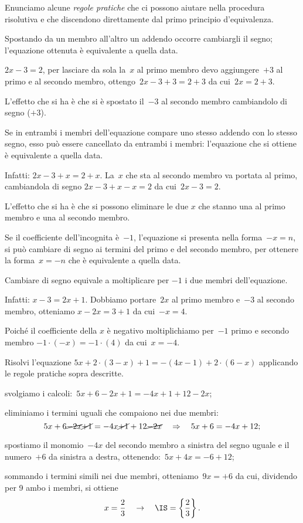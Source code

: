 Enunciamo alcune \emph{regole pratiche} che ci possono aiutare nella
procedura risolutiva e che discendono direttamente dal primo principio
d'equivalenza.
\begin{enumeratea}
\item Spostando da un membro all'altro un addendo occorre cambiargli il segno; l'equazione ottenuta è equivalente a quella data.

$2x-3=2$, per lasciare da sola la~$x$ al primo membro devo aggiungere~$+3$ al primo e
al secondo membro, ottengo~$2x-3+3=2+3$ da cui~$2x=2+3$.

L'effetto che si ha è che si è spostato il~$-3$ al
secondo membro cambiandolo di segno ($+3$).
\item Se in entrambi i membri dell'equazione compare uno
stesso addendo con lo stesso segno, esso può essere cancellato da
entrambi i membri: l'equazione che si ottiene è
equivalente a quella data.

Infatti:
$2x-3+x=2+x$. La~$x$ che sta al secondo membro va portata al primo, cambiandola di segno
$2x-3+x-x=2$ da cui~$2x-3=2$.

L'effetto che si ha è che si possono eliminare le due
$x$ che stanno una al primo membro e una al secondo membro.
\item Se il coefficiente dell'incognita è~$-1$, %
l'equazione si presenta nella forma~$-x=n$, si
può cambiare di segno ai termini del primo e del secondo membro, per
ottenere la forma~$x=-n$ che è equivalente a quella data.

Cambiare di segno equivale a moltiplicare per
$-1$ i due membri dell'equazione.

Infatti:
$x-3=2x+1$. Dobbiamo portare~$2x$ al primo membro e~$-3$ al secondo membro, otteniamo
$x-2x=3+1$ da cui~$-x=4$.

Poiché il coefficiente della $x$ è negativo moltiplichiamo per~$-1$
primo e secondo membro
$-1\cdot (-x)=-1\cdot (4)$ da cui~$x=-4$.
\end{enumeratea}

\begin{exrig}
\begin{esempio}
 Risolvi l'equazione $5x+2\cdot (3-x)+1=-(4x-1)+2\cdot (6-x)$ applicando le regole pratiche sopra descritte.
\begin{enumeratea}
 \item svolgiamo i calcoli:~$5x+6-2x+1=-4x+1+12-2x$;
 \item eliminiamo i termini uguali che compaiono nei due membri:
 \[5x+6 \cancel{-2x}\cancel{+1}=-4x \cancel{+1}+12\cancel{-2x}\quad\Rightarrow\quad 5x+6=-4x+12;\]
 \item spostiamo il monomio~$-4x$ del secondo membro a sinistra del segno uguale e il numero~$+6$
da sinistra a destra, ottenendo:~$5x+4x=-6+12$;
\item sommando i termini simili nei due membri, otteniamo~$9x=+6$ da cui, dividendo per 9
 ambo i membri, si ottiene
 \[x=\dfrac{2}{3}\quad\to\quad \IS =\left\{\dfrac{2}{3}\right\}.\]
 \end{enumeratea}
\end{esempio}
\end{exrig}

